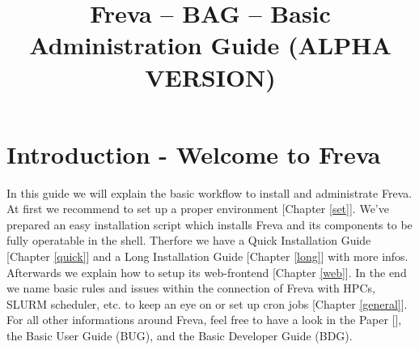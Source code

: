\documentclass[a4paper,11pt]{ltxdoc}
\title{Freva -- BAG -- Basic Administration Guide (ALPHA VERSION)}
\begin{document}
\maketitle

\section{Introduction - Welcome to Freva}
In this guide we will explain the basic workflow to install and administrate Freva. At first we recommend to set up a proper environment [Chapter \ref{set}]. We've prepared an easy installation script which installs Freva and its components to be fully operatable in the shell. Therfore we have a Quick Installation Guide [Chapter \ref{quick}] and a Long Installation Guide [Chapter \ref{long}] with more infos. Afterwards we explain how to setup its web-frontend [Chapter \ref{web}]. In the end we name basic rules and issues within the connection of Freva with HPCs, SLURM scheduler, etc. to keep an eye on or set up cron jobs [Chapter \ref{general}]. For all other informations around Freva, feel free to have a look in the Paper [], the Basic User Guide (BUG), and the Basic Developer Guide (BDG).
\end{document}

